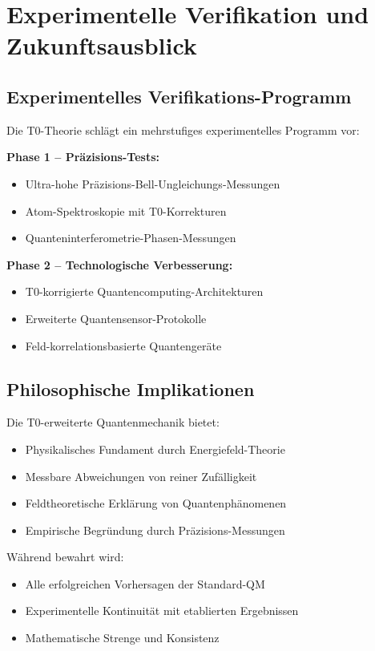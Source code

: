 \documentclass[12pt,a4paper]{article}
\begin{document}
	
	\section{Experimentelle Verifikation und Zukunftsausblick}
	
	
		\subsection{Experimentelles Verifikations-Programm}
		
		Die T0-Theorie schl\"agt ein mehrstufiges experimentelles Programm vor:
		
		\textbf{Phase 1 -- Pr\"azisions-Tests:}
		\begin{itemize}
			\item Ultra-hohe Pr\"azisions-Bell-Ungleichungs-Messungen
			\item Atom-Spektroskopie mit T0-Korrekturen
			\item Quanteninterferometrie-Phasen-Messungen
		\end{itemize}
		
		\textbf{Phase 2 -- Technologische Verbesserung:}
		\begin{itemize}
			\item T0-korrigierte Quantencomputing-Architekturen
			\item Erweiterte Quantensensor-Protokolle
			\item Feld-korrelationsbasierte Quantenger\"ate
		\end{itemize}
		
		\subsection{Philosophische Implikationen}
		
		Die T0-erweiterte Quantenmechanik bietet:
		\begin{itemize}
			\item Physikalisches Fundament durch Energiefeld-Theorie
			\item Messbare Abweichungen von reiner Zuf\"alligkeit
			\item Feldtheoretische Erkl\"arung von Quantenph\"anomenen
			\item Empirische Begr\"undung durch Pr\"azisions-Messungen
		\end{itemize}
		
		W\"ahrend bewahrt wird:
		\begin{itemize}
			\item Alle erfolgreichen Vorhersagen der Standard-QM
			\item Experimentelle Kontinuit\"at mit etablierten Ergebnissen
			\item Mathematische Strenge und Konsistenz
		\end{itemize}
		
\end{document}
